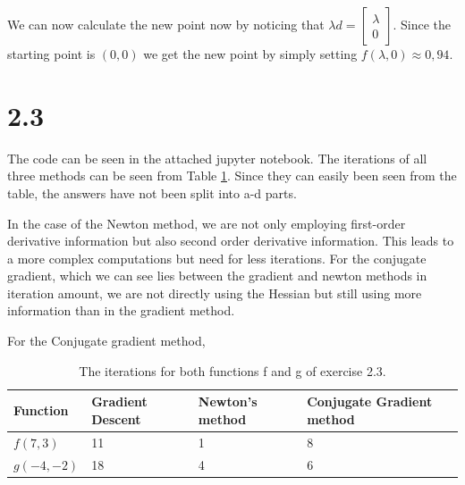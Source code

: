 \documentclass{article}
\begin{document}
	We can now calculate the new point now by noticing that $\lambda d = \begin{bmatrix} \lambda \\ 0 \end{bmatrix}$. Since the starting point is $(0,0)$ we get the new point by simply setting $f(\lambda,0) \approx 0,94$.
	
\section*{2.3}
\begin{table}[H]
	The code can be seen in the attached jupyter notebook.
	The iterations of all three methods can be seen from Table \ref{tab:iterations}. Since they can easily been seen from the table, the answers have not been split into a-d parts.
	
	In the case of the Newton method, we are not only employing first-order derivative information but also second order derivative information. This leads to a more complex computations but need for less iterations. For the conjugate gradient, which we can see lies between the gradient and newton methods in iteration amount, we are not directly using the Hessian but still using more information than in the gradient method.
	
	For the Conjugate gradient method, 
	\centering
	\caption{The iterations for both functions f and g of exercise 2.3.}
	\label{tab:iterations}
	\begin{tabular}{|l|l|l|l|}
		\hline
		Function   & Gradient Descent & Newton’s method & Conjugate Gradient method \\ \hline
		$f(7,3)$ & 11               & 1               & 8                       \\ \hline
		$g(-4,-2)$ & 18             & 4               & 6                       \\ \hline
	\end{tabular}
\end{table}
\end{document}
